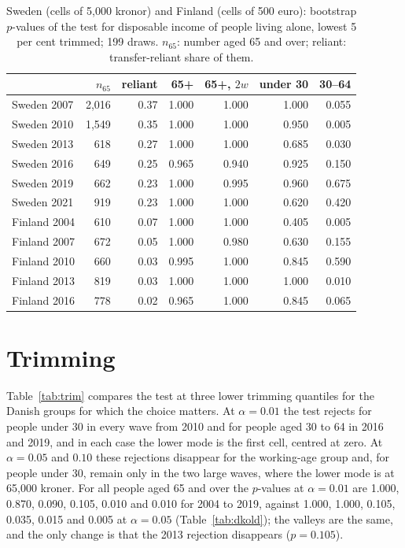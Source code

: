 \begin{table}[t]
\centering\small
\caption{Sweden (cells of 5{,}000 kronor) and Finland (cells of 500 euro): bootstrap $p$-values of the test for disposable income of people living alone, lowest 5 per cent trimmed; 199 draws. $n_{65}$: number aged 65 and over; reliant: transfer-reliant share of them.}\label{tab:sefi}
\begin{tabular}{lrrrrrr}
\toprule
 & $n_{65}$ & reliant & 65+ & 65+, $2w$ & under 30 & 30--64\\
\midrule
Sweden 2007 & 2{,}016 & 0.37 & 1.000 & 1.000 & 1.000 & 0.055\\
Sweden 2010 & 1{,}549 & 0.35 & 1.000 & 1.000 & 0.950 & 0.005\\
Sweden 2013 & 618 & 0.27 & 1.000 & 1.000 & 0.685 & 0.030\\
Sweden 2016 & 649 & 0.25 & 0.965 & 0.940 & 0.925 & 0.150\\
Sweden 2019 & 662 & 0.23 & 1.000 & 0.995 & 0.960 & 0.675\\
Sweden 2021 & 919 & 0.23 & 1.000 & 1.000 & 0.620 & 0.420\\
Finland 2004 & 610 & 0.07 & 1.000 & 1.000 & 0.405 & 0.005\\
Finland 2007 & 672 & 0.05 & 1.000 & 0.980 & 0.630 & 0.155\\
Finland 2010 & 660 & 0.03 & 0.995 & 1.000 & 0.845 & 0.590\\
Finland 2013 & 819 & 0.03 & 1.000 & 1.000 & 1.000 & 0.010\\
Finland 2016 & 778 & 0.02 & 0.965 & 1.000 & 0.845 & 0.065\\
\bottomrule
\end{tabular}
\end{table}

\section{Trimming}\label{app:trim}

Table~\ref{tab:trim} compares the test at three lower trimming quantiles for the Danish groups for which the choice matters. At $\alpha=0.01$ the test rejects for people under 30 in every wave from 2010 and for people aged 30 to 64 in 2016 and 2019, and in each case the lower mode is the first cell, centred at zero. At $\alpha=0.05$ and $0.10$ these rejections disappear for the working-age group and, for people under 30, remain only in the two large waves, where the lower mode is at 65{,}000 kroner. For all people aged 65 and over the $p$-values at $\alpha=0.01$ are 1.000, 0.870, 0.090, 0.105, 0.010 and 0.010 for 2004 to 2019, against 1.000, 1.000, 0.105, 0.035, 0.015 and 0.005 at $\alpha=0.05$ (Table~\ref{tab:dkold}); the valleys are the same, and the only change is that the 2013 rejection disappears ($p=0.105$).

